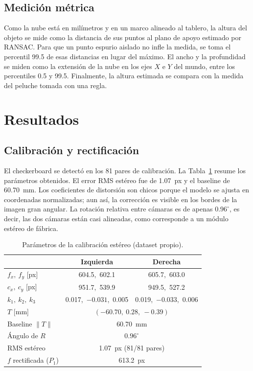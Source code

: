 \documentclass[conference]{IEEEtran}
\begin{document}
\subsection{Medición métrica}

Como la nube está en milímetros y en un marco alineado al tablero, la altura
del objeto se mide como la distancia de sus puntos al plano de apoyo
estimado por RANSAC. Para que un punto espurio aislado no infle la medida, se
toma el percentil 99.5 de esas distancias en lugar del máximo. El ancho y la
profundidad se miden como la extensión de la nube en los ejes $X$ e $Y$ del
mundo, entre los percentiles 0.5 y 99.5. Finalmente, la altura estimada se
compara con la medida del peluche tomada con una regla.

\section{Resultados}

\subsection{Calibración y rectificación}

El checkerboard se detectó en los 81 pares de calibración. La
Tabla~\ref{tab:calib} resume los parámetros obtenidos. El error RMS estéreo
fue de 1.07~px y el baseline de 60.70~mm. Los coeficientes de distorsión son
chicos porque el modelo se ajusta en coordenadas normalizadas; aun así, la
corrección es visible en los bordes de la imagen gran angular. La rotación
relativa entre cámaras es de apenas $0.96^\circ$, es decir, las dos cámaras
están casi alineadas, como corresponde a un módulo estéreo de fábrica.

\begin{table}[t]
  \centering
  \caption{Parámetros de la calibración estéreo (dataset propio).}
  \label{tab:calib}
  \begin{tabular}{@{}lcc@{}}
    \toprule
    & Izquierda & Derecha \\
    \midrule
    $f_x,\ f_y$ [px] & 604.5,\ 602.1 & 605.7,\ 603.0 \\
    $c_x,\ c_y$ [px] & 951.7,\ 539.9 & 949.5,\ 527.2 \\
    $k_1,\ k_2,\ k_3$ & 0.017,\ $-0.031$,\ 0.005 & 0.019,\ $-0.033$,\ 0.006 \\
    \midrule
    $T$ [mm] & \multicolumn{2}{c}{$(-60.70,\ 0.28,\ -0.39)$} \\
    Baseline $\|T\|$ & \multicolumn{2}{c}{60.70~mm} \\
    Ángulo de $R$ & \multicolumn{2}{c}{$0.96^\circ$} \\
    RMS estéreo & \multicolumn{2}{c}{1.07~px (81/81 pares)} \\
    $f$ rectificada ($P_1$) & \multicolumn{2}{c}{613.2~px} \\
    \bottomrule
  \end{tabular}
\end{table}
\end{document}
